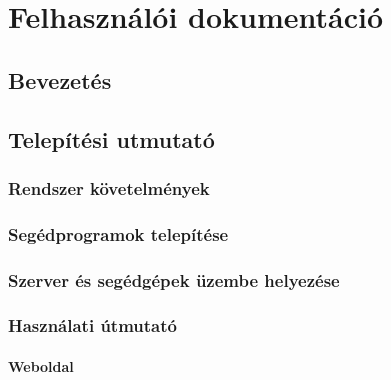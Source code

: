 \documentclass{elteikthesis}
\begin{document}
\chapter{Felhasználói dokumentáció}
\begin{comment}
A Felhasználói dokumentáció tartalmazza
- a megoldott probléma rövid megfogalmazását,
- a felhasznált módszerek rövid leírását,
- a program használatához szükséges összes információt

Magába foglalja a telepítési- (vagy üzemeltetési-) és a végfelhasználói leírást. Ezek
meghatározott célközönséghez szólnak, könnyen és gyorsan kell, hogy eligazítsák a
felhasználót a program használatában!

\end{comment}

\section{Bevezetés}
\section{Telepítési utmutató}
\subsection{Rendszer követelmények}
\subsection{Segédprogramok telepítése}
\subsection{Szerver és segédgépek üzembe helyezése}
\subsection{Használati útmutató}
\subsubsection{Weboldal}
\end{document}
